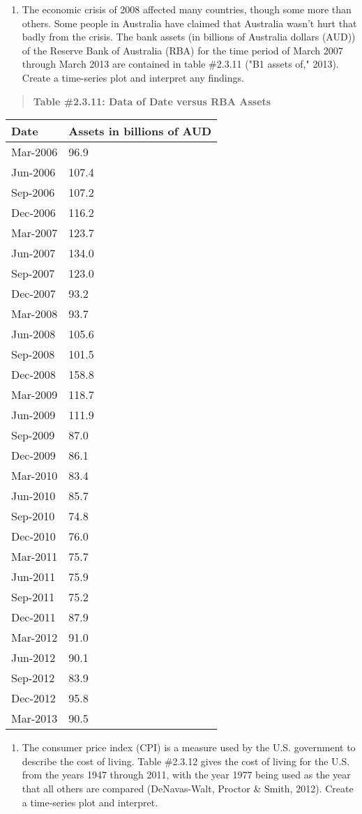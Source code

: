 \documentclass[]{book}
\providecommand{\tightlist}{%
  \setlength{\itemsep}{0pt}\setlength{\parskip}{0pt}}
\begin{document}
\begin{enumerate}
\def\labelenumi{\arabic{enumi}.}
\setcounter{enumi}{7}
\tightlist
\item
  The economic crisis of 2008 affected many countries, though some
  more than others. Some people in Australia have claimed that
  Australia wasn't hurt that badly from the crisis. The bank assets
  (in billions of Australia dollars (AUD)) of the Reserve Bank of
  Australia (RBA) for the time period of March 2007 through March 2013
  are contained in table \#2.3.11 ("B1 assets of," 2013). Create a
  time-series plot and interpret any findings.
\end{enumerate}

\begin{quote}
\textbf{Table \#2.3.11: Data of Date versus RBA Assets}
\end{quote}

\begin{longtable}[]{@{}ll@{}}
\toprule
Date & Assets in billions of AUD\tabularnewline
\midrule
\endhead
Mar-2006 & 96.9\tabularnewline
Jun-2006 & 107.4\tabularnewline
Sep-2006 & 107.2\tabularnewline
Dec-2006 & 116.2\tabularnewline
Mar-2007 & 123.7\tabularnewline
Jun-2007 & 134.0\tabularnewline
Sep-2007 & 123.0\tabularnewline
Dec-2007 & 93.2\tabularnewline
Mar-2008 & 93.7\tabularnewline
Jun-2008 & 105.6\tabularnewline
Sep-2008 & 101.5\tabularnewline
Dec-2008 & 158.8\tabularnewline
Mar-2009 & 118.7\tabularnewline
Jun-2009 & 111.9\tabularnewline
Sep-2009 & 87.0\tabularnewline
Dec-2009 & 86.1\tabularnewline
Mar-2010 & 83.4\tabularnewline
Jun-2010 & 85.7\tabularnewline
Sep-2010 & 74.8\tabularnewline
Dec-2010 & 76.0\tabularnewline
Mar-2011 & 75.7\tabularnewline
Jun-2011 & 75.9\tabularnewline
Sep-2011 & 75.2\tabularnewline
Dec-2011 & 87.9\tabularnewline
Mar-2012 & 91.0\tabularnewline
Jun-2012 & 90.1\tabularnewline
Sep-2012 & 83.9\tabularnewline
Dec-2012 & 95.8\tabularnewline
Mar-2013 & 90.5\tabularnewline
\bottomrule
\end{longtable}

\begin{enumerate}
\def\labelenumi{\arabic{enumi}.}
\setcounter{enumi}{8}
\tightlist
\item
  The consumer price index (CPI) is a measure used by the U.S.
  government to describe the cost of living. Table \#2.3.12 gives the
  cost of living for the U.S. from the years 1947 through 2011, with
  the year 1977 being used as the year that all others are compared
  (DeNavas-Walt, Proctor \& Smith, 2012). Create a time-series plot and
  interpret.
\end{enumerate}
\end{document}
